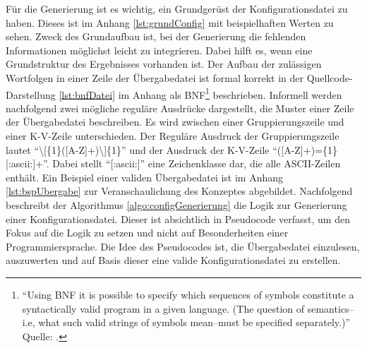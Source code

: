 Für die Generierung ist es wichtig, ein Grundgerüst der Konfigurationsdatei zu haben. Dieses ist im Anhang \vref{lst:grundConfig} mit beispielhaften Werten zu sehen. Zweck des Grundaufbau ist, bei der Generierung die fehlenden Informationen möglichst leicht zu integrieren. Dabei hilft es, wenn eine Grundstruktur des Ergebnisses vorhanden ist. Der Aufbau der zulässigen Wortfolgen in einer Zeile der Übergabedatei ist formal korrekt in der Quellcode-Darstellung \vref{lst:bnfDatei} im Anhang als \ac{BNF}\footnote{\enquote{Using BNF it is possible to specify which sequences of symbols constitute a syntactically valid program in a given language. (The question of semantics--i.e, what such valid strings of symbols mean--must be specified separately.)} Quelle: \cite[][]{mccracken_backus-naur_2003}.} beschrieben. Informell werden nachfolgend zwei mögliche reguläre Ausdrücke dargestellt, die Muster einer Zeile der Übergabedatei beschreiben. Es wird zwischen einer Gruppierungszeile und einer \ac{K-V}-Zeile unterschieden. Der Reguläre Ausdruck der Gruppierungszeile lautet \enquote{\textbackslash[\{1\}([A-Z]+)\textbackslash]\{1\}} und der Ausdruck der \ac{K-V}-Zeile \enquote{([A-Z]+)=\{1\}[:ascii:]+}. Dabei stellt \enquote{[:ascii:]} eine Zeichenklasse dar, die alle \textsc{ASCII}-Zeilen enthält. Ein Beispiel einer validen Übergabedatei ist im Anhang \ref{lst:bspUbergabe} zur Veranschaulichung des Konzeptes abgebildet. Nachfolgend beschreibt der Algorithmus \ref{algo:configGenerierung} die Logik zur Generierung einer Konfigurationsdatei. Dieser ist absichtlich in Pseudocode verfasst, um den Fokus auf die Logik zu setzen und nicht auf Besonderheiten einer Programmiersprache. Die Idee des Pseudocodes ist, die Übergabedatei einzulesen, auszuwerten und auf Basis dieser eine valide Konfigurationsdatei zu erstellen.

